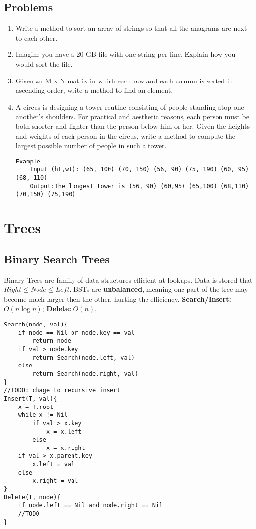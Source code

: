 \documentclass{article}
\begin{document}
	\subsection{Problems}
		\begin{enumerate}
			\item Write a method to sort an array of strings so that all the anagrams are next to each other.
			\item Imagine you have a 20 GB file with one string per line. Explain how you would sort the file.
			\item Given an M x N matrix in which each row and each column is sorted in ascending order, write a method to find an element.
			\item A circus is designing a tower routine consisting of people standing atop one another's shoulders. For practical and aesthetic reasons, each person must be both shorter and lighter than the person below him or her. Given the heights and weights of each person in the circus, write a method to compute the largest possible number of people in such a tower.
				\begin{lstlisting}[style=pseudo]
	Example
	Input (ht,wt): (65, 100) (70, 150) (56, 90) (75, 190) (60, 95) (68, 110)
	Output:The longest tower is (56, 90) (60,95) (65,100) (68,110) (70,150) (75,190)
				\end{lstlisting}
		\end{enumerate}


\clearpage
\section{Trees}

\subsection{Binary Search Trees}
Binary Trees are family of data structures efficient at lookups. Data is stored that $Right \leq Node \leq Left$. BSTs are {\bf unbalanced}, meaning one part of the tree may become much larger then the other, hurting the efficiency. {\bf Search/Insert:} $O(n \log n)$; {\bf Delete:} $O(n)$.

\begin{lstlisting}[style=pseudo]
Search(node, val){
	if node == Nil or node.key == val
		return node
	if val > node.key
		return Search(node.left, val)
	else
		return Search(node.right, val)
}
//TODO: chage to recursive insert
Insert(T, val){
	x = T.root
	while x != Nil
		if val > x.key
			x = x.left
		else
			x = x.right
	if val > x.parent.key
		x.left = val
	else
		x.right = val
}
Delete(T, node){
	if node.left == Nil and node.right == Nil
	//TODO
}
\end{lstlisting}
\end{document}
